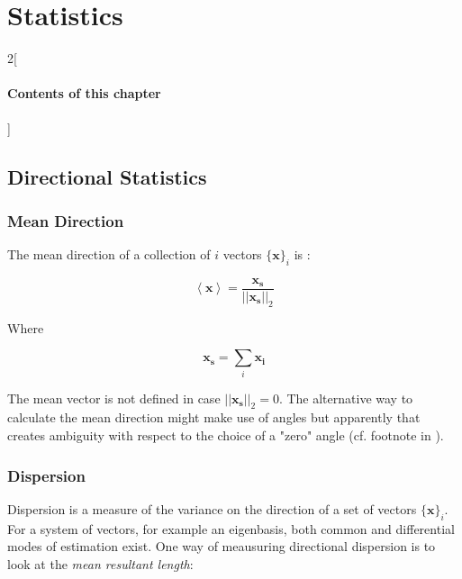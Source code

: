 \chapter{Statistics}
\label{sec:directionalstats}

\begin{multicols}{2}[\subsubsection*{Contents of this chapter}]
\end{multicols}

\section{Directional Statistics}

\subsection{Mean Direction}
The mean direction of a collection of $i$ vectors $\{\mathbf{x}\}_i$ is \cite{damask2019consistent}:

\begin{equation}
\left<\mathbf{x}\right> = \frac{\mathbf{x_s}}{||\mathbf{x_s}||_2}
\end{equation}

Where

\begin{equation}
\mathbf{x_s} = \sum_i \mathbf{x_i}
\end{equation}

The mean vector is not defined in case $||\mathbf{x_s}||_2 = 0$. The alternative way to calculate the mean direction might make use of angles but apparently that creates ambiguity with respect to the choice of a "zero" angle (cf. footnote in ).



\subsection{Dispersion}

Dispersion is a measure of the variance on the direction of a set of vectors $\{\mathbf{x}\}_i$. For a system of vectors, for example an eigenbasis, both common and differential modes of estimation exist. One way of meausuring directional dispersion is to look at the \textit{mean resultant length}:

